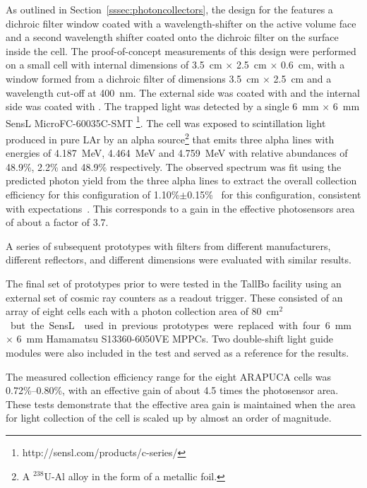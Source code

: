 As outlined in Section~\ref{sssec:photoncollectors}, the design for the  features a dichroic filter window coated with a wavelength-shifter on the \lar active volume face and a second wavelength shifter coated onto the dichroic filter on the surface inside the cell.  
The proof-of-concept measurements of this design were performed on a small cell with internal dimensions of \SI{3.5}{cm} $\times$ \SI{2.5}{cm} $\times$ \SI{0.6}{cm}, with a window formed from a dichroic filter of  dimensions \SI{3.5}{cm} $\times$ \SI{2.5}{cm} and a wavelength cut-off at \SI{400}{nm}. The external side was coated with  and the internal side was coated with . 
The trapped light was detected by a single \SI{6}{mm} $\times$ \SI{6}{mm} SensL MicroFC-60035C-SMT \footnote{http://sensl.com/products/c-series/}. The cell was exposed to scintillation light produced in pure LAr by an alpha source\footnote{A $^{238}$U-Al alloy in the form of a metallic foil.} that emits three alpha lines with energies of  \SI{4.187}{MeV}, \SI{4.464}{MeV} and \SI{4.759}{MeV} with relative abundances of 48.9\%, 2.2\% and 48.9\% respectively. 
The observed spectrum was fit using the predicted photon yield from the three alpha lines to extract the overall collection efficiency for this configuration of 1.10\%$\pm$0.15\%~\cite{Segreto:2018jdx} for this configuration, consistent with  expectations~\cite{Marinho:2018doi}. This corresponds to a gain in the effective photosensors area of about a factor of \num{3.7}. 

A series of subsequent prototypes with filters from different manufacturers, different reflectors, and different dimensions were evaluated with similar results. 

The final set of prototypes prior to  were tested in the TallBo facility using an external set of cosmic ray counters as a readout trigger. These consisted of an array of eight  cells each with a photon collection area of \SI{80}{cm$^2$} but the SensL  used in previous prototypes were replaced with four \SI{6}{mm} $\times$ \SI{6}{mm} Hamamatsu S13360-6050VE MPPCs. 
Two double-shift light guide modules were also included in the test and served as a reference for the  results.

The measured collection efficiency range for the eight ARAPUCA cells was 0.72\%--0.80\%, with an effective  gain of about 4.5 times the photosensor area. These tests demonstrate that the effective area gain is maintained when the area for light collection of the cell is scaled up by almost an order of magnitude.

